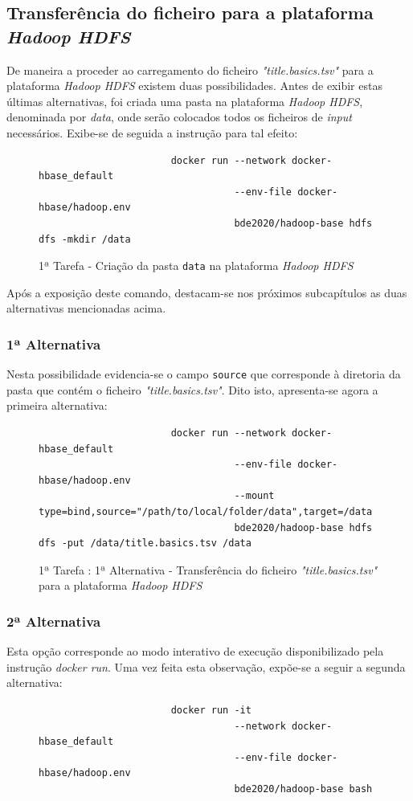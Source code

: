 \documentclass[a4paper]{report}
\begin{document}
{		\subsection{Transferência do ficheiro para a plataforma \textit{Hadoop HDFS}} \label{subsec:Task1-2}
		De maneira a proceder ao carregamento do ficheiro \textit{"title.basics.tsv"} para a plataforma \textit{Hadoop HDFS} existem duas possibilidades.
		Antes de exibir estas últimas alternativas, foi criada uma pasta na plataforma \textit{Hadoop HDFS}, denominada por \textit{data}, onde serão colocados todos os ficheiros de \textit{input} necessários.
		Exibe-se de seguida a instrução para tal efeito:
		\begin{figure}[H]
			{
				\color{teal}
				\begin{verbatim}
					   docker run --network docker-hbase_default
					              --env-file docker-hbase/hadoop.env
					              bde2020/hadoop-base hdfs dfs -mkdir /data
				\end{verbatim}
			}
			\caption{1ª Tarefa - Criação da pasta \texttt{data} na plataforma \textit{Hadoop HDFS}}
            \label{fig:9}
		\end{figure}

		Após a exposição deste comando, destacam-se nos próximos subcapítulos as duas alternativas mencionadas acima.

			\subsubsection{1ª Alternativa}
			Nesta possibilidade evidencia-se o campo \texttt{source} que corresponde à diretoria da pasta que contém o ficheiro \textit{"title.basics.tsv"}.
			Dito isto, apresenta-se agora a primeira alternativa:
			\begin{figure}[H]
				{
					\color{teal}
					\begin{verbatim}
					   docker run --network docker-hbase_default
					              --env-file docker-hbase/hadoop.env
					              --mount type=bind,source="/path/to/local/folder/data",target=/data
					              bde2020/hadoop-base hdfs dfs -put /data/title.basics.tsv /data
					\end{verbatim}
				}
				\caption{1ª Tarefa : 1ª Alternativa - Transferência do ficheiro \textit{"title.basics.tsv"} para a plataforma \textit{Hadoop HDFS}}
				\label{fig:10}
			\end{figure}

			\subsubsection{2ª Alternativa}
			Esta opção corresponde ao modo interativo de execução disponibilizado pela instrução \textit{docker run}.
			Uma vez feita esta observação, expõe-se a seguir a segunda alternativa:
			\begin{figure}[H]
				{
					\color{teal}
					\begin{verbatim}
					   docker run -it
					              --network docker-hbase_default
					              --env-file docker-hbase/hadoop.env
					              bde2020/hadoop-base bash


\end{verbatim}}
\end{figure}}
\end{document}
